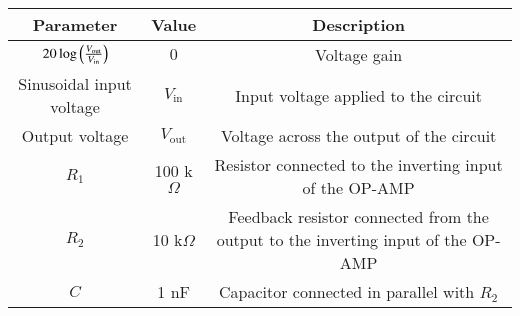 
\begin{tabular}{|c|c|c|}
\hline
\textbf{Parameter} &  \textbf{Value} & \textbf{Description} \\
\hline
 $20 \log \left(\frac{V_{\text{out}}}{V_{\text{in}}}\right)$ & $0$ &Voltage gain\\
\hline
 Sinusoidal input voltage & $V_{\text{in}}$ & Input voltage applied to the circuit \\
\hline
 Output voltage & $V_{\text{out}}$ & Voltage across the output of the circuit \\
\hline
$R_1$ & 100 k$\Omega$ & Resistor connected to the inverting input of the OP-AMP \\
\hline
$R_2$ & 10 k$\Omega$ & Feedback resistor connected from the output to the inverting input of the OP-AMP \\
\hline
$C$ & 1 nF & Capacitor connected in parallel with $R_2$ \\
 \hline
\end{tabular}


